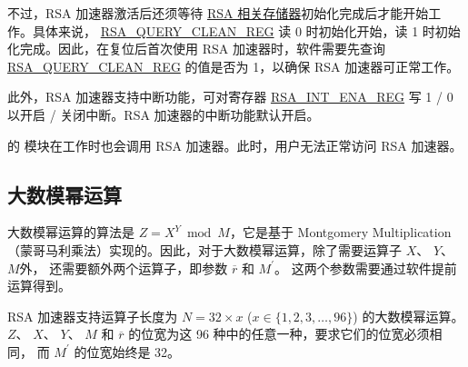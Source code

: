 \documentclass[main\_\_CN.tex]{subfiles}
\begin{document}
不过，RSA 加速器激活后还须等待 \hyperref[sec:mem-sum]{RSA 相关存储器}初始化完成后才能开始工作。具体来说， \hyperref[regdesc:RSAQUERYCLEANREG]{RSA\_QUERY\_CLEAN\_REG} 读 0 时初始化开始，读 1 时初始化完成。因此，在复位后首次使用 RSA 加速器时，软件需要先查询 \hyperref[regdesc:RSAQUERYCLEANREG]{RSA\_QUERY\_CLEAN\_REG} 的值是否为 1，以确保 RSA 加速器可正常工作。

此外，RSA 加速器支持中断功能，可对寄存器 \hyperref[regdesc:RSAINTENAREG]{RSA\_INT\_ENA\_REG} 写 1 / 0 以开启 / 关闭中断。RSA 加速器的中断功能默认开启。

\begin{importantlisting}
\vspace{-0.5em}

    \chipname{} 的  模块在工作时也会调用 RSA 加速器。此时，用户无法正常访问 RSA 加速器。
\end{importantlisting}
\subsection{大数模幂运算} \label{sec:rsa-large-modular-Exponentiation}

大数模幂运算的算法是 \begin{math}Z = X^{Y} \bmod M\end{math}，它是基于 Montgomery Multiplication （蒙哥马利乘法）实现的。因此，对于大数模幂运算，除了需要运算子
\begin{math}X\end{math}、
\begin{math}Y\end{math}、
\begin{math}M\end{math}外，
还需要额外两个运算子，即参数
\begin{math}\overline{r}\end{math} 和 
\begin{math}M^{\prime}\end{math}。
这两个参数需要通过软件提前运算得到。

RSA 加速器支持运算子长度为 
\begin{math}N = 32 \times x\end{math} (\begin{math}x \in \{ 1,2,3, \dots, 96\} \end{math}) 的大数模幂运算。
\begin{math}Z\end{math}、
\begin{math}X\end{math}、
\begin{math}Y\end{math}、
\begin{math}M\end{math} 和 
\begin{math}\overline{r}\end{math}
的位宽为这 96 种中的任意一种，要求它们的位宽必须相同，
而 \begin{math}M^{\prime}\end{math} 的位宽始终是 32。
\end{document}
